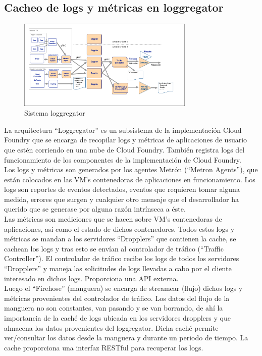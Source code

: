 \documentclass[a4paper,11pt]{article}
\begin{document}
\subsection{Cacheo de logs y métricas en loggregator}
\begin{figure}[H]
    \centering
    \includegraphics[width=0.75\textwidth]{fran2_2.png}
    \caption{Sistema loggregator}
    \label{fig:fran2_2}
\end{figure}
La arquitectura “Loggregator” es un subsistema de la implementación Cloud Foundry que se encarga de recopilar logs y métricas de aplicaciones de usuario que estén corriendo en una nube de Cloud Foundry. También registra logs del funcionamiento de los componentes de la implementación de Cloud Foundry.\\
Los logs y métricas son generados por los agentes Metrón (“Metron Agents”), que están colocados en las VM’s contenedoras de aplicaciones en funcionamiento.
Los logs son reportes de eventos detectados, eventos que requieren tomar alguna medida, errores que surgen y cualquier otro mensaje que el desarrollador ha querido que se generase por alguna razón intrínseca a éste.\\
Las métricas son mediciones que se hacen sobre VM’s contenedoras de aplicaciones, así como el estado de dichos contenedores.
Todos estos logs y métricas se mandan a los servidores “Dropplers” que contienen la cache, se cachean los logs y tras esto se envían al controlador de tráfico (“Traffic Controller”).
El controlador de tráfico recibe los logs de todos los servidores “Dropplers” y maneja las solicitudes de logs llevadas a cabo por el cliente interesado en dichos logs. Proporciona una API externa.\\
Luego el “Firehose” (manguera) se encarga de streamear (flujo) dichos logs y métricas provenientes del controlador de tráfico.
Los datos del flujo de la manguera no son constantes, van pasando y se van borrando, de ahí la importancia de la caché de logs ubicada en los servidores dropplers y que almacena los datos provenientes del loggregator. Dicha caché permite ver/consultar los datos desde la manguera y durante un periodo de tiempo. La cache proporciona una interfaz RESTful para recuperar los logs.
\end{document}
